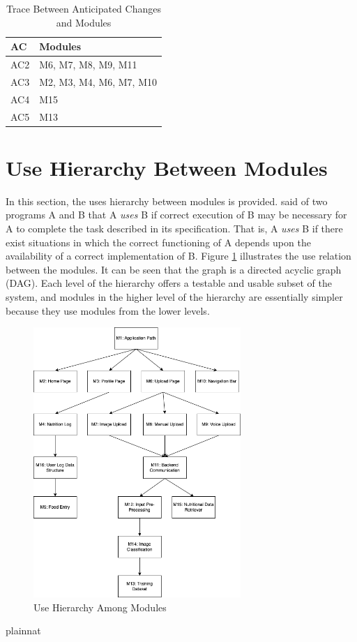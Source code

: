 \documentclass[12pt, titlepage]{article}
\begin{document}
\begin{table}[H]
\centering
\begin{tabular}{p{} p{}}
\toprule
\textbf{AC} & \textbf{Modules}\\
\midrule
AC2 & M6, M7, M8, M9, M11\\
AC3 & M2, M3, M4, M6, M7, M10\\
AC4 & M15\\
AC5 & M13\\
\bottomrule
\end{tabular}
\caption{Trace Between Anticipated Changes and Modules}
\label{TblACT}
\end{table}

\section{Use Hierarchy Between Modules} \label{SecUse}

In this section, the uses hierarchy between modules is
provided. \citet{Parnas1978} said of two programs A and B that A {\em uses} B if
correct execution of B may be necessary for A to complete the task described in
its specification. That is, A {\em uses} B if there exist situations in which
the correct functioning of A depends upon the availability of a correct
implementation of B.  Figure \ref{FigUH} illustrates the use relation between
the modules. It can be seen that the graph is a directed acyclic graph
(DAG). Each level of the hierarchy offers a testable and usable subset of the
system, and modules in the higher level of the hierarchy are essentially simpler
because they use modules from the lower levels.

\begin{figure}[H]
\centering
\includegraphics[width=0.7\textwidth]{use_hierarchy.png}
\caption{Use Hierarchy Among Modules}
\label{FigUH}
\end{figure}


 {plainnat}

\end{document}
